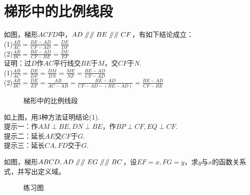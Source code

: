 \section{梯形中的比例线段}
\begin{definition}
    如图，梯形$ACFD$中，$AD\mathrel{/\mkern-5mu/} \mathrel{/\mkern-5mu/} BE\mathrel{/\mkern-5mu/} \mathrel{/\mkern-5mu/} CF$，有如下结论成立：\\
    (1)$\frac{AB}{AC}=\frac{BE-AD}{CF-AD}=\frac{DE}{DF}$ \\
    (2)$\frac{AB}{BC}=\frac{BE-AD}{CF-BE}=\frac{DE}{EF}$ \\
    证明：过$D$作$AC$平行线交$BE$于$M$，交$CF$于$N$. \\
    (1)$\frac{AB}{AC}=\frac{DE}{DF}=\frac{DM}{DN}=\frac{ME}{NF}=\frac{BE-AD}{CF-AD}$ \\
    (2)$\frac{AB}{BC}=\frac{DE}{EF}=\frac{AB}{AC-AB}=\frac{BE-AD}{CF-AD-(BE-AD)}=\frac{BE-AD}{CF-BE}$
\end{definition}
\begin{figure}[H]
    \centering
    \resizebox{4cm}{!}{}
    \caption{梯形中的比例线段}
\end{figure}
\begin{problem}
如上图，用3种方法证明结论(1).\\
提示一：作$AM\perp BE,DN\perp BE$，作$BP \perp CF,EQ \perp CF$. \\
提示二：延长$AE$交$CF$于$G$. \\
提示三：延长$CA,FD$交于$G$.
\end{problem}
\begin{problem}
如图，梯形$ABCD,AD\mathrel{/\mkern-5mu/} \mathrel{/\mkern-5mu/} EG \mathrel{/\mkern-5mu/} \mathrel{/\mkern-5mu/} BC$，设$EF=x,FG=y$，求$y$与$x$的函数关系式，并写出定义域。\\
\end{problem}
\begin{figure}[H]
    \centering
    \resizebox{4cm}{!}{}
    \caption{练习图}
\end{figure}
\clearpage
